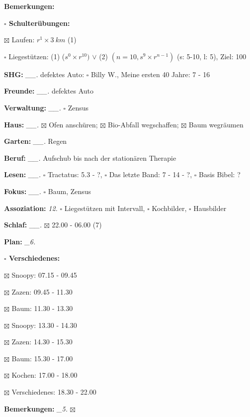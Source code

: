 \documentclass[10pt,a4paper]{article}
\newcommand\prop[1] {{\color {alizarin} {\bf #1}}}        %
\newcommand\mand[1] {{\color {burntorange} {\bf #1}}}     %
\newcommand\topspace{\vskip -15pt \hskip 20pt}
\newcommand\bottomspace{\vskip 4pt}
\newcommand\n[1] { {\sl #1.} \hskip 5pt }
\begin{document}
\begin{mdframed}[style=daystyle]
\begin{labeling}{{\mand {Bemerkungen:}}}
\begin{minipage}{0.75\textwidth}
\begin{labeling}{\prop {$\square$ {Schulterübungen:}}}
      \item[$\boxtimes$ Laufen:]          $r^1 \times 3\ km$ (1)
      \item[$\square$ Liegestützen:]    (1) ($s^0 \times r^{10})$ $\vee$ (2)
          $(n=10, s^9 \times r^{n-1})$ (s: 5-10, l: 5), Ziel: 100
      \end{labeling}
    \end{minipage}
    \bottomspace        
  \item[{\mand {SHG:}}]          \n{\_\_} defektes Auto: $\square$ Billy W., Meine ersten 40 Jahre: 7 - 16
  \item[{\mand {Freunde:}}]      \n{\_\_} defektes Auto
  \item[{\mand {Verwaltung:}}]   \n{\_\_} $\square$ Zensus
  \item[{\mand {Haus:}}]         \n{\_\_} $\boxtimes$ Ofen anschüren;
    $\boxtimes$ Bio-Abfall wegschaffen; $\boxtimes$ Baum wegräumen
  \item[{\mand {Garten:}}]       \n{\_\_} Regen
  \item[{\mand {Beruf:}}]        \n{\_\_} Aufschub bis nach der stationären Therapie
  \item[{\mand {Lesen:}}]        \n{\_\_} $\square$ Tractatus: 5.3 - ?,
      $\square$ Das letzte Band: 7 - 14 - ?, $\square$ Basis Bibel: ?
  \item[{\mand {Fokus:}}]        \n{\_\_} $\square$ Baum, Zensus
  \item[{\mand {Assoziation:}}]    \n{12} $\square$ Liegestützen mit Intervall,
    $\square$ Kochbilder, $\square$ Hausbilder
  \item[{\mand {Schlaf:}}]       \n{\_\_} $\boxtimes$ 22.00 - 06.00 (7)
  \item[{\mand {Plan:}}]          \n{\_6}
    \topspace
    \begin{minipage}{0.75\textwidth}  
      \begin{labeling}{\prop {$\square$ {Verschiedenes:}}} 
        \setlength\itemsep{-3pt}
      \item[$\boxtimes$ Snoopy:]  07.15 - 09.45
      \item[$\boxtimes$ Zazen:]   09.45 - 11.30
      \item[$\boxtimes$ Baum:]    11.30 - 13.30
      \item[$\boxtimes$ Snoopy:]  13.30 - 14.30
      \item[$\boxtimes$ Zazen:]   14.30 - 15.30
      \item[$\boxtimes$ Baum:]    15.30 - 17.00
      \item[$\boxtimes$ Kochen:]  17.00 - 18.00
      \item[$\boxtimes$ Verschiedenes:]  18.30 - 22.00
      \end{labeling}
    \end{minipage}
    \bottomspace
  \item[{\mand {Bemerkungen:}}]   \n{\_5} $\boxtimes$
  \end{labeling}
    

\end{mdframed}
\end{document}
